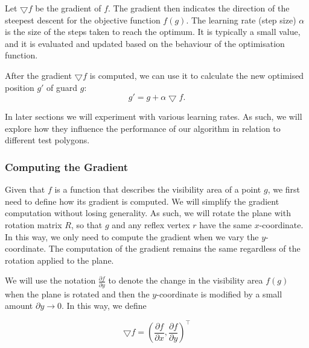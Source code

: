 Let $\bigtriangledown f$ be the gradient of $f$. The gradient then indicates the direction of the steepest descent for the objective function $f(g)$.
The learning rate (step size) $\alpha$ is the size of the steps taken to reach the optimum. It is typically a small value, and it is evaluated and updated based on the behaviour of the optimisation function. 

After the gradient $\bigtriangledown f$ is computed, we can use it to calculate the new optimised position $g'$ of guard $g$: $$g' = g + \alpha\bigtriangledown f.$$


In later sections we will experiment with various learning rates. As such, we will explore how they influence the performance of our algorithm in relation to different test polygons. 

\newpage
\subsubsection{Computing the Gradient}

Given that $f$ is a function that describes the visibility area of a point $g$, we first need to define how its gradient is computed. We will simplify the gradient computation without losing generality. As such, we will rotate the plane with rotation matrix $R$, so that $g$ and any reflex vertex $r$ have the same $x$-coordinate. In this way, we only need to compute the gradient when we vary the $y$-coordinate. The computation of the gradient remains the same regardless of the rotation applied to the plane.


We will use the notation $\frac{\partial f}{\partial y}$ to denote the change in the visibility area $f(g)$ when the plane is rotated and then the $y$-coordinate is modified by a small amount $\partial y \rightarrow 0$. In this way, we define 

\begin{equation}
    \bigtriangledown f = \left(\frac{\partial f}{\partial x}, \frac{\partial f}{\partial y}\right)^\intercal \label{eq:gradient}
\end{equation}

